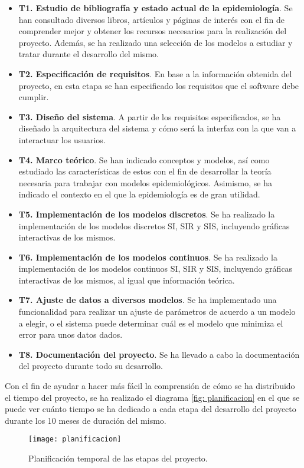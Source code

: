 \begin{itemize}
\item \textbf{T1. Estudio de bibliografía y estado actual de la epidemiología}. Se han consultado diversos libros, artículos y páginas de interés con el fin de comprender mejor y obtener los recursos necesarios para la realización del proyecto. Además, se ha realizado una selección de los modelos a estudiar y tratar durante el desarrollo del mismo.
\item \textbf{T2. Especificación de requisitos}. En base a la información obtenida del proyecto, en esta etapa se han especificado los requisitos que el software debe cumplir.
\item \textbf{T3. Diseño del sistema}. A partir de los requisitos especificados, se ha diseñado la arquitectura del sistema y cómo será la interfaz con la que van a interactuar los usuarios.
\item \textbf{T4. Marco teórico}. Se han indicado conceptos y modelos, así como estudiado las características de estos con el fin de desarrollar la teoría necesaria para trabajar con modelos epidemiológicos. Asimismo, se ha indicado el contexto en el que la epidemiología es de gran utilidad.
\item \textbf{T5. Implementación de los modelos discretos}. Se ha realizado la implementación de los modelos discretos SI, SIR y SIS, incluyendo gráficas interactivas de los mismos.
\item \textbf{T6. Implementación de los modelos continuos}. Se ha realizado la implementación de los modelos continuos SI, SIR y SIS, incluyendo gráficas interactivas de los mismos, al igual que información teórica.
\item \textbf{T7. Ajuste de datos a diversos modelos}. Se ha implementado una funcionalidad para realizar un ajuste de parámetros de acuerdo a un modelo a elegir, o el sistema puede determinar cuál es el modelo que minimiza el error para unos datos dados.
\item \textbf{T8. Documentación del proyecto}. Se ha llevado a cabo la documentación del proyecto durante todo su desarrollo.
\end{itemize}

Con el fin de ayudar a hacer más fácil la comprensión de cómo se ha distribuido el tiempo del proyecto, se ha realizado el diagrama \eqref{fig: planificacion} en el que se puede ver cuánto tiempo se ha dedicado a cada etapa del desarrollo del proyecto durante los 10 meses de duración del mismo.

\begin{figure}[!h]
\begin{center}
\caption{Planificación temporal de las etapas del proyecto.}
\label{fig: planificacion}
\texttt{[image: planificacion]}
\end{center}
\end{figure}


